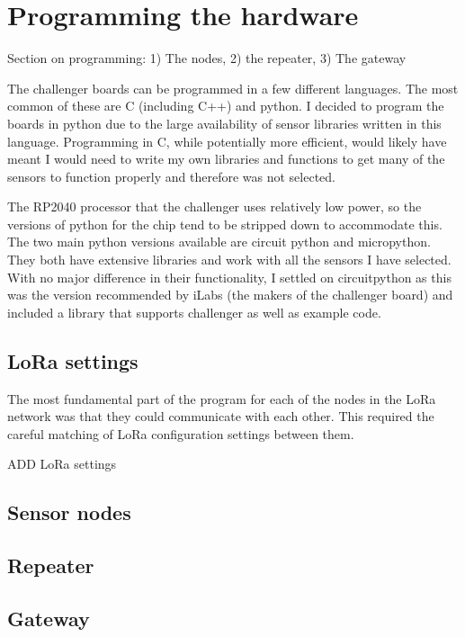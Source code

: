 \section{Programming the hardware}

Section on programming: 1) The nodes, 2) the repeater, 3) The gateway

The challenger boards can be programmed in a few different languages. The most
common of these are C (including C++) and python. I decided to program the
boards in python due to the large availability of sensor libraries written in
this language. Programming in C, while potentially more efficient, would likely
have meant I would need to write my own libraries and functions to get many of
the sensors to function properly and therefore was not selected.

The RP2040 processor that the challenger uses relatively low power, so the
versions of python for the chip tend to be stripped down to accommodate this.
The two main python versions available are circuit python and micropython. They
both have extensive libraries and work with all the sensors I have selected.
With no major difference in their functionality, I settled on circuitpython as
this was the version recommended by iLabs (the makers of the challenger board)
and included a library that supports challenger as well as example code.

\subsection{LoRa settings}

The most fundamental part of the program for each of the nodes in the LoRa
network was that they could communicate with each other. This required the
careful matching of LoRa configuration settings between them.

    {ADD LoRa settings}

\subsection{Sensor nodes}

\subsection{Repeater}

\subsection{Gateway}

